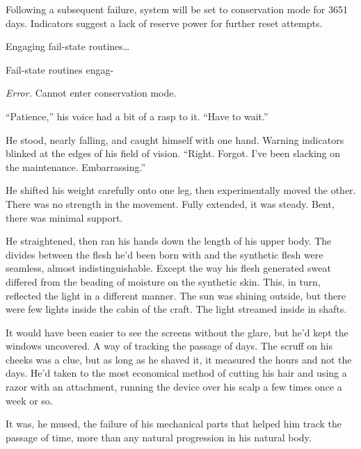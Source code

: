 Following a subsequent failure, system will be set to conservation mode for 3651 days.  Indicators suggest a lack of reserve power for further reset attempts.



Engaging fail-state routines\ldots



Fail-state routines engag-



\emph{Error.  }Cannot enter conservation mode.



\blacksquare



``Patience,'' his voice had a bit of a rasp to it.  ``Have to wait.''



He stood, nearly falling, and caught himself with one hand.  Warning indicators blinked at the edges of his field of vision.  ``Right.  Forgot.  I've been slacking on the maintenance.  Embarrassing.''



He shifted his weight carefully onto one leg, then experimentally moved the other.  There was no strength in the movement.  Fully extended, it was steady.  Bent, there was minimal support.



He straightened, then ran his hands down the length of his upper body.  The divides between the flesh he'd been born with and the synthetic flesh were seamless, almost indistinguishable.  Except the way his flesh generated sweat differed from the beading of moisture on the synthetic skin.  This, in turn, reflected the light in a different manner.  The sun was shining outside, but there were few lights inside the cabin of the craft.  The light streamed inside in shafts.



It would have been easier to see the screens without the glare, but he'd kept the windows uncovered.  A way of tracking the passage of days.  The scruff on his cheeks was a clue, but as long as he shaved it, it measured the hours and not the days.  He'd taken to the most economical method of cutting his hair and using a razor with an attachment, running the device over his scalp a few times once a week or so.



It was, he mused, the failure of his mechanical parts that helped him track the passage of time, more than any natural progression in his natural body.



